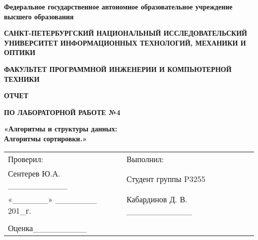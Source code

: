 \documentclass[12pt]{article}
\begin{document}
\setlength{\parindent}{0pt}
\pagestyle{empty}
\begin{center}
\normalsize
\textbf{Федеральное государственное автономное образовательное учреждение высшего образования}

\small
\medskip 
\textbf{САНКТ-ПЕТЕРБУРГСКИЙ НАЦИОНАЛЬНЫЙ ИССЛЕДОВАТЕЛЬСКИЙ  УНИВЕРСИТЕТ ИНФОРМАЦИОННЫХ ТЕХНОЛОГИЙ, МЕХАНИКИ И ОПТИКИ}

\medskip 
\textbf{ФАКУЛЬТЕТ ПРОГРАММНОЙ ИНЖЕНЕРИИ И КОМПЬЮТЕРНОЙ ТЕХНИКИ}
\end{center}
\bigskip\bigskip\bigskip\bigskip\bigskip\bigskip\bigskip\bigskip\bigskip\bigskip\bigskip\bigskip
\begin{center}
\par\medskip\par\smallskip
\Large
 
\par\smallskip
\textbf{ОТЧЕТ} 

\textbf{ПО ЛАБОРАТОРНОЙ РАБОТЕ №4}

\large
\par\bigskip
\textbf{«Алгоритмы и структуры данных: \\ Алгоритмы сортировки.»}
\par\bigskip\par\bigskip\par\bigskip\par\bigskip\par\bigskip\par\bigskip
\par\bigskip\par\bigskip\par\bigskip\par\bigskip\par\bigskip\par\bigskip
\par\bigskip\par\bigskip\par\bigskip\par\bigskip\par\bigskip\par\bigskip
\end{center}
\begin{center}
\begin{tabular}{lllll}
Проверил:	 	 						& \hspace{80pt}	&	Выполнил:										&\\
Сентерев Ю.А.	 \_\_\_\_\_\_\_\_\_\_	&			    &	Студент группы P3255							&\\
«\_\_\_\_\_\_» 	 \_\_\_\_\_\_\_ 201\_г.  & 				&	Кабардинов Д. В. \_\_\_\_\_\_\_\_\_\_\_			&\\
										&				&													&\\
Оценка\hspace{12pt}\_\_\_\_\_\_\_\_\_	&				&													&\\
\end{tabular}
\par\bigskip\par\bigskip\par\bigskip
                                                  
\par\bigskip \par\bigskip
\end{center}
\end{document}
